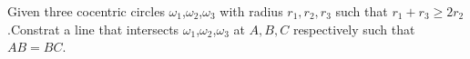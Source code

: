 Given three cocentric circles $\omega_1$,$\omega_2$,$\omega_3$ with radius $r_1,r_2,r_3$ such that $r_1+r_3\geq {2r_2}$.Constrat a line that intersects $\omega_1$,$\omega_2$,$\omega_3$ at $A,B,C$ respectively such that $AB=BC$.